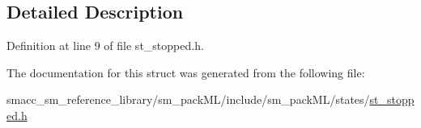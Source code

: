 \subsection{Detailed Description}


Definition at line 9 of file st\+\_\+stopped.\+h.



The documentation for this struct was generated from the following file\+:\begin{DoxyCompactItemize}
\item 
smacc\+\_\+sm\+\_\+reference\+\_\+library/sm\+\_\+pack\+M\+L/include/sm\+\_\+pack\+M\+L/states/\hyperlink{sm__packML_2include_2sm__packML_2states_2st__stopped_8h}{st\+\_\+stopped.\+h}\end{DoxyCompactItemize}
